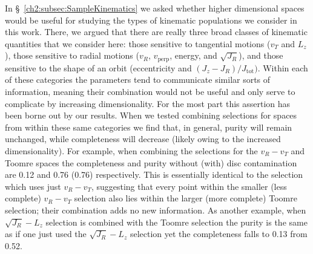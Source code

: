 In \S~\ref{ch2:subsec:SampleKinematics} we asked whether higher dimensional spaces would be useful for studying the types of kinematic populations we consider in this work. There, we argued that there are really three broad classes of kinematic quantities that we consider here: those sensitive to tangential motions ($v_{T}$ and $L_{z}$), those sensitive to radial motions ($v_{R}$, $v_\mathrm{perp}$, energy, and $\sqrt{J_{R}}$), and those sensitive to the shape of an orbit (eccentricity and $(J_{z}-J_{R})/J_\mathrm{tot})$. Within each of these categories the parameters tend to communicate similar sorts of information, meaning their combination would not be useful and only serve to complicate by increasing dimensionality. For the most part this assertion has been borne out by our results. When we tested combining selections for spaces from within these same categories we find that, in general, purity will remain unchanged, while completeness will decrease (likely owing to the increased dimensionality). For example, when combining the selections for the $v_{R}-v_{T}$ and Toomre spaces the completeness and purity without (with) disc contamination are 0.12 and 0.76 (0.76) respectively. This is essentially identical to the selection which uses just $v_{R}-v_{T}$, suggesting that every point within the smaller (less complete) $v_{R}-v_{T}$ selection also lies within the larger (more complete) Toomre selection; their combination adds no new information. As another example, when $\sqrt{J_{R}}-L_{z}$ selection is combined with the Toomre selection the purity is the same as if one just used the $\sqrt{J_{R}}-L_{z}$ selection yet the completeness falls to 0.13 from 0.52. 

